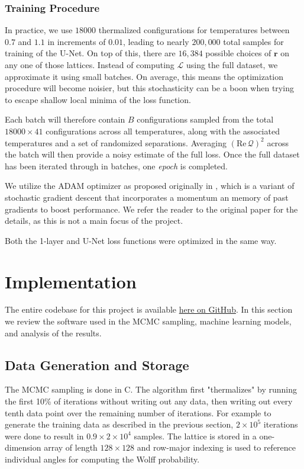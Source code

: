 \documentclass[12pt]{article}
\begin{document}
\subsubsection{Training Procedure}

In practice, we use $18000$ thermalized configurations for temperatures between $0.7$ and $1.1$ in increments of $0.01$, leading to nearly $200,000$ total samples for training of the U-Net.
On top of this, there are $16,384$ possible choices of $\mathbf{r}$ on any one of those lattices. Instead of computing $\mathcal{L}$ using the full dataset, we approximate it
using small batches. On average, this means the optimization procedure will become noisier, but this stochasticity can be a boon when trying to escape shallow local minima of the loss function.

Each batch will therefore contain $B$ configurations sampled from the total $18000\times41$ configurations across all temperatures, along with the
associated temperatures and a set of randomized separations. Averaging $\left(\mathrm{Re}\,\mathcal{Q}\right)^2$ across the batch will then provide
a noisy estimate of the full loss. Once the full dataset has been iterated through in batches, one \textit{epoch} is completed.

We utilize the ADAM optimizer as proposed originally in \cite{kingma2017adammethodstochasticoptimization}, which is a variant of stochastic gradient descent that incorporates 
a momentum an memory of past gradients to boost performance. We refer the reader to the original paper for the details, as this is not a main focus of the project. 

Both the 1-layer and U-Net loss functions were optimized in the same way.

\section{Implementation}

The entire codebase for this project is available \href{https://github.com/amshak01/XY-Contour-Deformations}{here on GitHub}. In this
section we review the software used in the MCMC sampling, machine learning models, and analysis of the results.

\subsection{Data Generation and Storage}

The MCMC sampling is done in C. The algorithm first "thermalizes" by running the first 10\% of iterations without writing out any data, 
then writing out every tenth data point over the remaining number of iterations. For example to generate the training data as described 
in the previous section, $2\times10^5$ iterations were done to result in $0.9\times2\times10^4$ samples. The lattice is stored in a one-dimension array of length $128\times128$ and 
row-major indexing is used to reference individual angles for computing the Wolff probability.
\end{document}
